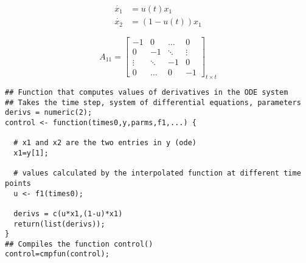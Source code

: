 \documentclass[12pt, oneside]{article}   	%
\begin{document}
\begin{align}
\dot{x_1} & = u(t) x_1 \nonumber \\
\dot{x_2} & = (1-u(t)) x_1 
\end{align}

\begin{equation}
A_{11}=
  \begin{bmatrix}
    -1		& 0 	 	& \ldots 	& 0  	 \\
    0 	 	& -1  	& \ddots 	& \vdots  \\
    \vdots   & \ddots 	& -1		& 0  \\
    0 		& \ldots 	& 0 		& -1  
  \end{bmatrix}_{ t \times t}
\end{equation}

\begin{lstlisting}
## Function that computes values of derivatives in the ODE system
## Takes the time step, system of differential equations, parameters
derivs = numeric(2); 
control <- function(times0,y,parms,f1,...) {
  
  # x1 and x2 are the two entries in y (ode)
  x1=y[1]; 
  
  # values calculated by the interpolated function at different time points
  u <- f1(times0);
  
  derivs = c(u*x1,(1-u)*x1) 
  return(list(derivs));
}
## Compiles the function control()
control=cmpfun(control); 
\end{lstlisting}

\clearpage

\printindex

\clearpage
\nocite{*}

 

\end{document}
